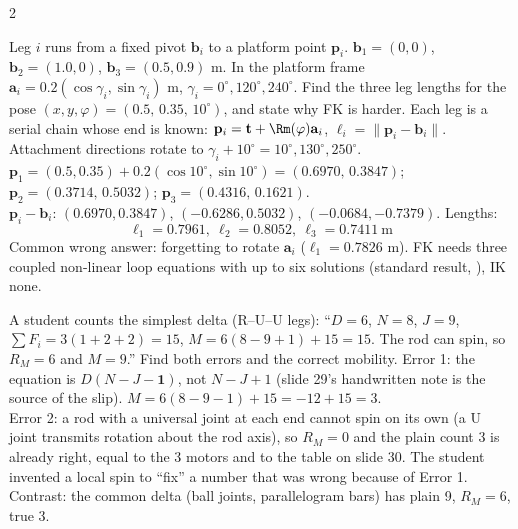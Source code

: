 \begin{multicols}{2}
\begin{examq}
Leg $i$ runs from a fixed pivot $\mathbf b_i$ to a platform point $\mathbf p_i$. $\mathbf b_1=(0,0)$, $\mathbf b_2=(1.0,0)$, $\mathbf b_3=(0.5,0.9)$ m. In the platform frame $\mathbf a_i=0.2(\cos\gamma_i,\sin\gamma_i)$ m, $\gamma_i=0^\circ,120^\circ,240^\circ$. Find the three leg lengths for the pose $(x,y,\varphi)=(0.5,\,0.35,\,10^\circ)$, and state why FK is harder.
\solution
Each leg is a serial chain whose end is known: $\mathbf p_i=\mathbf t+\Rm(\varphi)\mathbf a_i$, $\ell_i=\lVert\mathbf p_i-\mathbf b_i\rVert$. Attachment directions rotate to $\gamma_i+10^\circ=10^\circ,130^\circ,250^\circ$.\\
$\mathbf p_1=(0.5,0.35)+0.2(\cos10^\circ,\sin10^\circ)=(0.6970,\,0.3847)$; $\mathbf p_2=(0.3714,\,0.5032)$; $\mathbf p_3=(0.4316,\,0.1621)$.\\
$\mathbf p_i-\mathbf b_i$: $(0.6970,0.3847)$, $(-0.6286,0.5032)$, $(-0.0684,-0.7379)$. Lengths:
\[\boxed{\ell_1=0.7961,\ \ell_2=0.8052,\ \ell_3=0.7411\ \text{m}}\]
Common wrong answer: forgetting to rotate $\mathbf a_i$ ($\ell_1=0.7826$ m). FK needs three coupled non-linear loop equations with up to six solutions (standard result, \added), IK none.
\end{examq}

\begin{examq}
A student counts the simplest delta (R--U--U legs): ``$D=6$, $N=8$, $J=9$, $\sum F_i=3(1+2+2)=15$, $M=6(8-9+1)+15=15$. The rod can spin, so $R_M=6$ and $M=9$.'' Find both errors and the correct mobility.
\solution
Error 1: the equation is $D(N-J-\mathbf{1})$, not $N-J+1$ (slide 29's handwritten note is the source of the slip). $M=6(8-9-1)+15=-12+15=\boxed{3}$.\\
Error 2: a rod with a universal joint at each end cannot spin on its own (a U joint transmits rotation about the rod axis), so $R_M=0$ and the plain count 3 is already right, equal to the 3 motors and to the table on slide 30. The student invented a local spin to ``fix'' a number that was wrong because of Error 1.\\
Contrast: the common delta (ball joints, parallelogram bars) has plain 9, $R_M=6$, true 3.
\end{examq}
\end{multicols}
